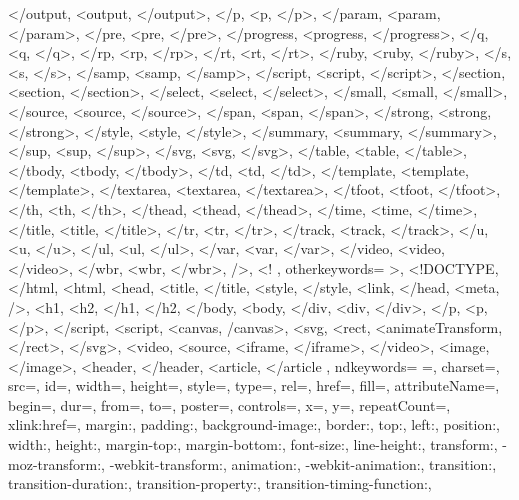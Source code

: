 {{        </output, <output, </output>,
        </p, <p, </p>,
        </param, <param, </param>,
        </pre, <pre, </pre>,
        </progress, <progress, </progress>,
        </q, <q, </q>,
        </rp, <rp, </rp>,
        </rt, <rt, </rt>,
        </ruby, <ruby, </ruby>,
        </s, <s, </s>,
        </samp, <samp, </samp>,
        </script, <script, </script>,
        </section, <section, </section>,
        </select, <select, </select>,
        </small, <small, </small>,
        </source, <source, </source>,
        </span, <span, </span>,
        </strong, <strong, </strong>,
        </style, <style, </style>,
        </summary, <summary, </summary>,
        </sup, <sup, </sup>,
        </svg, <svg, </svg>,
        </table, <table, </table>,
        </tbody, <tbody, </tbody>,
        </td, <td, </td>,
        </template, <template, </template>,
        </textarea, <textarea, </textarea>,
        </tfoot, <tfoot, </tfoot>,
        </th, <th, </th>,
        </thead, <thead, </thead>,
        </time, <time, </time>,
        </title, <title, </title>,
        </tr, <tr, </tr>,
        </track, <track, </track>,
        </u, <u, </u>,
        </ul, <ul, </ul>,
        </var, <var, </var>,
        </video, <video, </video>,
        </wbr, <wbr, </wbr>,
        />, <!
    },
    otherkeywords={
        >,
        <!DOCTYPE,
        </html, <html, <head, <title, </title, <style, </style, <link, </head, <meta, />, <h1, <h2, </h1, </h2,
        </body, <body,
        </div, <div, </div>, 
        </p, <p, </p>,
        </script, <script,
        <canvas, /canvas>, <svg, <rect, <animateTransform, </rect>, </svg>, <video, <source, <iframe, </iframe>, </video>, <image, </image>, <header, </header, <article, </article
    },
    ndkeywords={
        =,
        charset=, src=, id=, width=, height=, style=, type=, rel=, href=,
        fill=, attributeName=, begin=, dur=, from=, to=, poster=, controls=, x=, y=, repeatCount=, xlink:href=,
        margin:, padding:, background-image:, border:, top:, left:, position:, width:, height:, margin-top:, margin-bottom:, font-size:, line-height:,
        transform:, -moz-transform:, -webkit-transform:,
        animation:, -webkit-animation:,
        transition:,  transition-duration:, transition-property:, transition-timing-function:,
    }
}